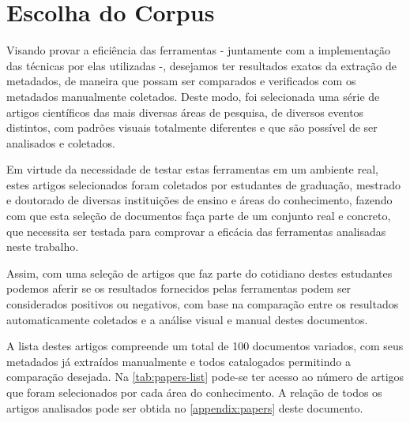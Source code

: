 \section{Escolha do Corpus}
\label{sec:corpus}


Visando provar a eficiência das ferramentas - juntamente com a implementação das técnicas por elas utilizadas -, desejamos ter resultados exatos da extração de metadados, de maneira que possam ser comparados e verificados com os metadados manualmente coletados. Deste modo, foi selecionada uma série de artigos científicos das mais diversas áreas de pesquisa, de diversos eventos distintos, com padrões visuais totalmente diferentes e que são possível de ser analisados e coletados.


Em virtude da necessidade de testar estas ferramentas em um ambiente real, estes artigos selecionados foram coletados por estudantes de graduação, mestrado e doutorado de diversas instituições de ensino e áreas do conhecimento, fazendo com que esta seleção de documentos faça parte de um conjunto real e concreto, que necessita ser testada para comprovar a eficácia das ferramentas analisadas neste trabalho.

Assim, com uma seleção de artigos que faz parte do cotidiano destes estudantes podemos aferir se os resultados fornecidos pelas ferramentas podem ser considerados positivos ou negativos, com base na comparação entre os resultados automaticamente coletados e a análise visual e manual destes documentos.


A lista destes artigos compreende um total de 100 documentos variados, com seus metadados já extraídos manualmente e todos catalogados permitindo a comparação desejada. Na \autoref{tab:papers-list} pode-se ter acesso ao número de artigos que foram selecionados por cada área do conhecimento. A relação de todos os artigos analisados pode ser obtida no \autoref{appendix:papers} deste documento.

